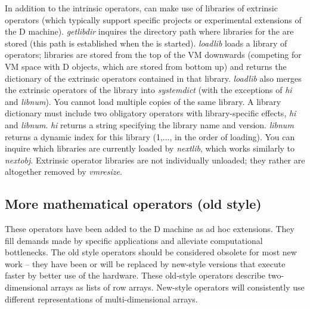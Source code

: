 In addition to the intrinsic operators,  can make use of libraries of extrinsic operators (which typically support specific projects or experimental extensions of the D machine). \emph{getlibdir} inquires the directory path where libraries for the  are stored (this path is established when the  is started). \emph{loadlib} loads a library of operators; libraries are stored from the top of the VM downwards (competing for VM space with D objects, which are stored from bottom up) and returns the dictionary of the extrinsic operators contained in that library. \emph{loadlib} also merges the extrinsic operators of the library into \emph{systemdict} (with the exceptions of \emph{hi} and \emph{libnum}). You cannot load multiple copies of the same library. A library dictionary must include two obligatory operators with library-specific effects, \emph{hi} and \emph{libnum}. \emph{hi} returns a string specifying the library name and version. \emph{libnum} returns a dynamic index for this library (1,..., in the order of loading). You can inquire which libraries are currently loaded by \emph{nextlib}, which works similarly to \emph{nextobj}. Extrinsic operator libraries are not individually unloaded; they rather are altogether removed by \emph{vmresize}.


\subsection{More mathematical operators (old style)}\label{ssec:oldstyle}

These operators have been added to the D machine as ad hoc extensions. They fill demands made by specific applications and alleviate computational bottlenecks. The old style operators should be considered obsolete for most new work -- they have been or will be replaced by new-style versions that execute faster by better use of the hardware. These old-style operators describe two-dimensional arrays as lists of row arrays. New-style operators will consistently use different representations of multi-dimensional arrays.\\


